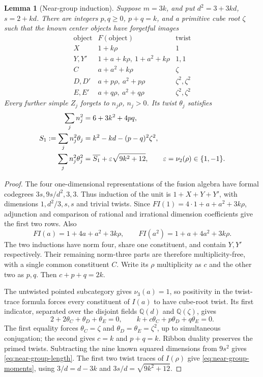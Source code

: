 \documentclass[11pt,a4paper]{article}
\newtheorem{lemma}[theorem]{Lemma}
\theoremstyle{definition}
\begin{document}
\begin{lemma}[Near-group induction]\label{lem:near-group-induction}
Suppose $m=3k$, and put $d^2=3+3kd$, $s=2+kd$.
There are integers $p,q\ge0$, $p+q=k$, and a primitive cube root
$\zeta$ such that the known center objects have forgetful images
\[
\begin{array}{c|c|c}
 \text{object}&F(\text{object})&\text{twist}\\\hline
 X&1+k\rho&1\\
 Y,Y'&1+a+k\rho,\ 1+a^2+k\rho&1,1\\
 C&a+a^2+k\rho&\zeta\\
 D,D'&a+p\rho,\ a^2+p\rho&\zeta^2,\zeta^2\\
 E,E'&a+q\rho,\ a^2+q\rho&\zeta^2,\zeta^2
\end{array}
\]
Every further simple $Z_j$ forgets to $n_j\rho$, $n_j>0$. Its twist
$\theta_j$ satisfies
\begin{align}
 \sum_jn_j^2&=6+3k^2+4pq,\label{eq:near-group-length}\\
 S_1:=\sum_jn_j^2\theta_j&=k^2-kd-(p-q)^2\zeta^2,\notag\\
 \sum_jn_j^2\theta_j^2&=\overline{S_1}
                 +\varepsilon\sqrt{9k^2+12},
 \qquad\varepsilon=\nu_2(\rho)\in\{1,-1\}.
 \label{eq:near-group-moments}
\end{align}
\end{lemma}
\begin{proof}
The four one-dimensional representations of the fusion algebra have
formal codegrees $3s,9s/d^2,3,3$. Thus induction of the unit is
$1+X+Y+Y'$, with dimensions $1,d^2/3,s,s$ and trivial twists.
Since $FI(1)=4\cdot1+a+a^2+3k\rho$, adjunction and comparison of
rational and irrational dimension coefficients give the first two
rows. Also
\[
 FI(a)=1+4a+a^2+3k\rho,\qquad
 FI(a^2)=1+a+4a^2+3k\rho.
\]
The two inductions have norm four, share one constituent, and contain
$Y,Y'$ respectively. Their remaining norm-three parts are therefore
multiplicity-free, with a single common constituent $C$.
Write its $\rho$ multiplicity as $c$ and the other two as $p,q$.
Then $c+p+q=2k$.

The untwisted pointed subcategory gives $\nu_3(a)=1$, so positivity
in the twist-trace formula forces every constituent of $I(a)$ to
have cube-root twist. Its first indicator, separated over the
disjoint fields $\mathbb Q(d)$ and $\mathbb Q(\zeta)$, gives
\[
 2+2\theta_C+\theta_D+\theta_E=0,\qquad
 k+c\theta_C+p\theta_D+q\theta_E=0.
\]
The first equality forces $\theta_C=\zeta$ and
$\theta_D=\theta_E=\zeta^2$, up to simultaneous conjugation; the
second gives $c=k$ and $p+q=k$. Ribbon duality preserves the primed
twists. Subtracting the nine known squared dimensions from $9s^2$
gives \eqref{eq:near-group-length}. The first two twist traces of
$I(\rho)$ give \eqref{eq:near-group-moments}, using
$3/d=d-3k$ and $3s/d=\sqrt{9k^2+12}$.
\end{proof}
\end{document}

